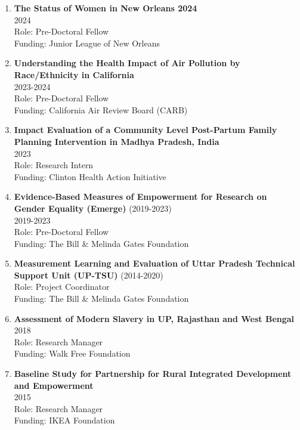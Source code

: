 \documentclass[13pt,letterpaper]{article}
\begin{document}
\begin{enumerate}
\item \textbf{The Status of Women in New Orleans 2024} \\
2024 \\
Role: Pre-Doctoral Fellow \\
Funding: Junior League of New Orleans 

\item \textbf{Understanding the Health Impact of Air Pollution by Race/Ethnicity in California}\\
2023-2024 \\
Role: Pre-Doctoral Fellow \\
Funding: California Air Review Board (CARB) 

\item \textbf{Impact Evaluation of a Community Level Post-Partum Family Planning Intervention in Madhya Pradesh, India} \\
2023 \\
Role: Research Intern \\
Funding: Clinton Health Action Initiative 

\item \textbf{Evidence-Based Measures of Empowerment for Research on Gender Equality (Emerge)} (2019-2023)\\
2019-2023 \\
Role: Pre-Doctoral Fellow \\
Funding: The Bill \& Melinda Gates Foundation 

\item \textbf{Measurement Learning and Evaluation of Uttar Pradesh Technical Support Unit (UP-TSU)} (2014-2020)\\
Role: Project Coordinator \\
Funding: The Bill \& Melinda Gates Foundation 

\item \textbf{Assessment of Modern Slavery in UP, Rajasthan and West Bengal} \\
2018 \\
Role: Research Manager \\
Funding: Walk Free Foundation 

\item \textbf{Baseline Study for Partnership for Rural Integrated Development and Empowerment} \\
2015 \\
Role: Research Manager \\
Funding: IKEA Foundation  


\end{enumerate}
\end{document}
